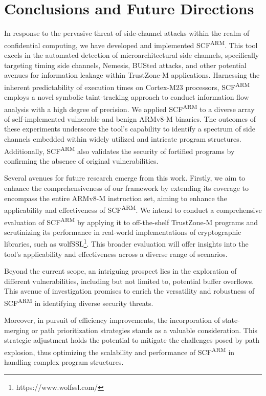 \section{Conclusions and Future Directions}

In response to the pervasive threat of side-channel attacks within the realm of confidential computing, we have developed and implemented \gls{SCF}\textsuperscript{ARM}. This tool excels in the automated detection of microarchitectural side channels, specifically targeting timing side channels, Nemesis, BUSted attacks, and other potential avenues for information leakage within TrustZone-M applications. Harnessing the inherent predictability of execution times on Cortex-M23 processors, \gls{SCF}\textsuperscript{ARM} employs a novel symbolic taint-tracking approach to conduct information flow analysis with a high degree of precision. We applied \gls{SCF}\textsuperscript{ARM} to a diverse array of self-implemented vulnerable and benign ARMv8-M binaries. The outcomes of these experiments underscore the tool's capability to identify a spectrum of side channels embedded within widely utilized and intricate program structures. Additionally, \gls{SCF}\textsuperscript{ARM} also validates the security of fortified programs by confirming the absence of original vulnerabilities.

Several avenues for future research emerge from this work. Firstly, we aim to enhance the comprehensiveness of our framework by extending its coverage to encompass the entire ARMv8-M instruction set, aiming to enhance the applicability and effectiveness of \gls{SCF}\textsuperscript{ARM}. We intend to conduct a comprehensive evaluation of \gls{SCF}\textsuperscript{ARM} by applying it to off-the-shelf TrustZone-M programs and scrutinizing its performance in real-world implementations of cryptographic libraries, such as wolfSSL\footnote{https://www.wolfssl.com/}. This broader evaluation will offer insights into the tool's applicability and effectiveness across a diverse range of scenarios.

Beyond the current scope, an intriguing prospect lies in the exploration of different vulnerabilities, including but not limited to, potential buffer overflows. This avenue of investigation promises to enrich the versatility and robustness of \gls{SCF}\textsuperscript{ARM} in identifying diverse security threats.

Moreover, in pursuit of efficiency improvements, the incorporation of state-merging \cite{kuznetsov2012efficient} or path prioritization strategies \cite{baldoni2018survey, li2013steering} stands as a valuable consideration. This strategic adjustment holds the potential to mitigate the challenges posed by path explosion, thus optimizing the scalability and performance of \gls{SCF}\textsuperscript{ARM} in handling complex program structures.


